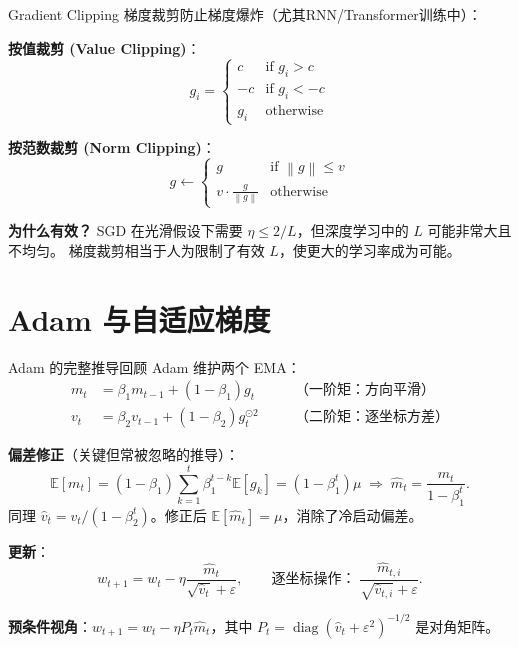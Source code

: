\documentclass[aspectratio=169,10pt]{ctexbeamer}
\newcommand{\E}{\mathbb{E}}
\newcommand{\diag}{\operatorname{diag}}
\newcommand{\eps}{\varepsilon}
\newcommand{\norm}[1]{\left\lVert #1 \right\rVert}
\begin{document}
\begin{frame}{Gradient Clipping}
梯度裁剪防止梯度爆炸（尤其RNN/Transformer训练中）：

\vspace{0.2cm}
\textbf{按值裁剪 (Value Clipping)}：
\[
  g_i = \begin{cases}
    c & \text{if } g_i > c\\
    -c & \text{if } g_i < -c\\
    g_i & \text{otherwise}
  \end{cases}
\]

\vspace{0.2cm}
\textbf{按范数裁剪 (Norm Clipping)}：
\[
  g \leftarrow \begin{cases}
    g & \text{if } \norm{g} \le v\\
    v \cdot \frac{g}{\norm{g}} & \text{otherwise}
  \end{cases}
\]

\vspace{0.2cm}
\textbf{为什么有效？} SGD 在光滑假设下需要 $\eta\le 2/L$，但深度学习中的 $L$ 可能非常大且不均匀。
梯度裁剪相当于人为限制了有效 $L$，使更大的学习率成为可能。
\end{frame}

\section{Adam 与自适应梯度}

\begin{frame}{Adam 的完整推导回顾}
Adam 维护两个 EMA：
\[
  \begin{aligned}
    m_t &= \beta_1 m_{t-1} + (1-\beta_1)g_t &\quad& \text{（一阶矩：方向平滑）}\\
    v_t &= \beta_2 v_{t-1} + (1-\beta_2)g_t^{\odot2} &\quad& \text{（二阶矩：逐坐标方差）}
  \end{aligned}
\]

\vspace{0.2cm}
\textbf{偏差修正}（关键但常被忽略的推导）：
\[
  \E[m_t] = (1-\beta_1)\sum_{k=1}^t \beta_1^{t-k}\E[g_k]
  = (1-\beta_1^t)\mu \;\Longrightarrow\; \hat m_t = \frac{m_t}{1-\beta_1^t}.
\]
同理 $\hat v_t = v_t/(1-\beta_2^t)$。修正后 $\E[\hat m_t]=\mu$，消除了冷启动偏差。

\vspace{0.2cm}
\textbf{更新}：
\[
  w_{t+1} = w_t - \eta\frac{\hat m_t}{\sqrt{\hat v_t}+\eps},\qquad
  \text{逐坐标操作：}\;\frac{\hat m_{t,i}}{\sqrt{\hat v_{t,i}}+\eps}.
\]

\vspace{0.2cm}
\textbf{预条件视角}：$w_{t+1}=w_t-\eta P_t\hat m_t$，其中 $P_t=\diag(\hat v_t+\eps^2)^{-1/2}$ 是对角矩阵。
\end{frame}
\end{document}
